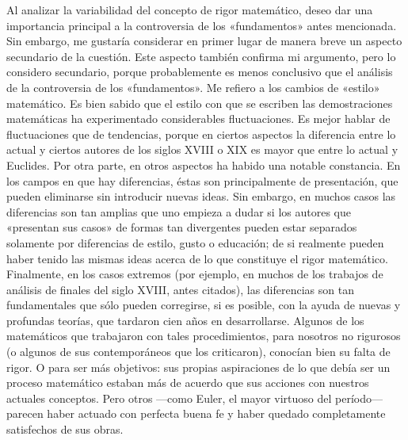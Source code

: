 \documentclass[a4paper, 12pt]{article}
\begin{document}
Al analizar la variabilidad del concepto de rigor matemático, deseo dar una importancia principal a la controversia de los «fundamentos» antes mencionada. Sin embargo, me gustaría considerar en primer lugar de manera breve un aspecto secundario de la cuestión. Este aspecto también confirma mi argumento, pero lo considero secundario, porque probablemente es menos conclusivo que el análisis de la controversia de los «fundamentos». Me refiero a los cambios de «estilo» matemático. Es bien sabido que el estilo con que se escriben las demostraciones matemáticas ha experimentado considerables fluctuaciones. Es mejor hablar de fluctuaciones que de tendencias, porque en ciertos aspectos la diferencia entre lo actual y ciertos autores de los siglos XVIII o XIX es mayor que entre lo actual y Euclides. Por otra parte, en otros aspectos ha habido una notable constancia. En los campos en que hay diferencias, éstas son principalmente de presentación, que pueden eliminarse sin introducir nuevas ideas. Sin embargo, en muchos casos las diferencias son tan amplias que uno empieza a dudar si los autores que «presentan sus casos» de formas tan divergentes pueden estar separados solamente por diferencias de estilo, gusto o educación; de si realmente pueden haber tenido las mismas ideas acerca de lo que constituye el rigor matemático. Finalmente, en los casos extremos (por ejemplo, en muchos de los trabajos de análisis de finales del siglo XVIII, antes citados), las diferencias son tan fundamentales que sólo pueden corregirse, si es posible, con la ayuda de nuevas y profundas teorías, que tardaron cien años en desarrollarse. Algunos de los matemáticos que trabajaron con tales procedimientos, para nosotros no rigurosos (o algunos de sus contemporáneos que los criticaron), conocían bien su falta de rigor. O para ser más objetivos: sus propias aspiraciones de lo que debía ser un proceso matemático estaban más de acuerdo que sus acciones con nuestros actuales conceptos. Pero otros ---como Euler, el mayor virtuoso del período--- parecen haber actuado con perfecta buena fe y haber quedado completamente satisfechos de sus obras.
\end{document}
